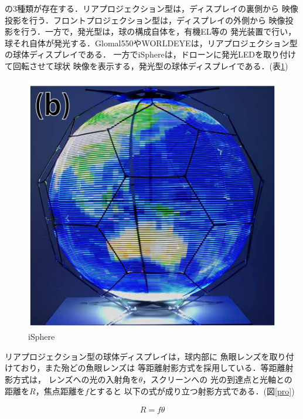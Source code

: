 の3種類が存在する．リアプロジェクション型は，ディスプレイの裏側から
映像投影を行う．フロントプロジェクション型は，ディスプレイの外側から
映像投影を行う．一方で，発光型は，球の構成自体を，有機EL等の
発光装置で行い，球それ自体が発光する．Glomal550やWORLDEYEは，リアプロジェクション型
の球体ディスプレイである．
一方でiSphereは，ドローンに発光LEDを取り付けて回転させて球状
映像を表示する，発光型の球体ディスプレイである．(表\ref{isphere})
\begin{figure}[tbp]
  \centering
  \includegraphics[scale=1.0]{fig/isphere.png}
  \caption{iSphere\cite{23}}\label{isphere}
\end{figure}

リアプロジェクション型の球体ディスプレイは，球内部に
魚眼レンズを取り付けており，また殆どの魚眼レンズは
等距離射影方式を採用している．等距離射影方式は，
レンズへの光の入射角を$\theta$，スクリーンへの
光の到達点と光軸との距離を$R$，焦点距離を$f$とすると
以下の式が成り立つ射影方式である．(図\ref{pro})

\begin{eqnarray}
  R = f\theta \nonumber \\
\end{eqnarray}

